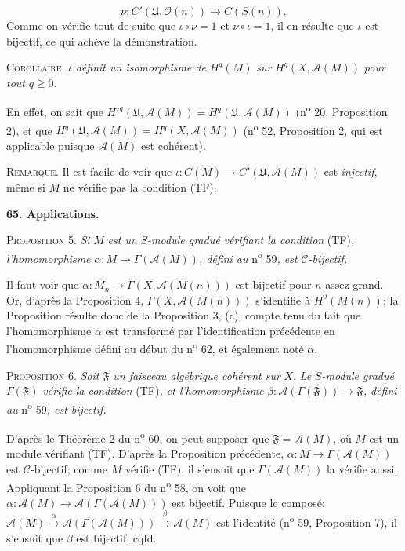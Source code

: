 \begin{equation*}
\nu : C'(\mathfrak{U}, \mathcal{O}(n)) \to C(S(n)).
\end{equation*}
Comme on vérifie tout de suite que $\iota \circ \nu = 1$ et $\nu \circ \iota = 1$, il en résulte que $\iota$ est bijectif, ce qui achève la démonstration.

\textsc{Corollaire}. $\iota$ \textit{définit un isomorphisme de} $H^q(M)$ \textit{sur} $H^q(X, \mathcal{A}(M))$ \textit{pour tout} $q \geqq 0$.

En effet, on sait que $H'^q(\mathfrak{U}, \mathcal{A}(M)) = H^q(\mathfrak{U}, \mathcal{A}(M))$ (n\textsuperscript{o} 20, Proposition 2), et que $H^q(\mathfrak{U}, \mathcal{A}(M)) = H^q(X, \mathcal{A}(M))$ (n\textsuperscript{o} 52, Proposition 2, qui est applicable puisque $\mathcal{A}(M)$ est cohérent).

\textsc{Remarque}. Il est facile de voir que $\iota : C(M) \to C'(\mathfrak{U}, \mathcal{A}(M))$ est \textit{injectif}, même si $M$ ne vérifie pas la condition (TF).


\textbf{65. Applications.}

\textsc{Proposition} 5. \textit{Si} $M$ \textit{est un} $S$\textit{-module gradué vérifiant la condition} (TF)\textit{, l'homomorphisme} $\alpha : M \to \Gamma(\mathcal{A}(M))$\textit{, défini au} n\textsuperscript{o} 59\textit{, est} $\mathcal{C}$\textit{-bijectif.}

Il faut voir que $\alpha : M_n \to \Gamma(X, \mathcal{A}(M(n)))$ est bijectif pour $n$ assez grand. Or, d'après la Proposition 4, $\Gamma(X, \mathcal{A}(M(n)))$ s'identifie à $H^0(M(n))$; la Proposition résulte donc de la Proposition 3, (c), compte tenu du fait que l'homomorphisme $\alpha$ est transformé par l'identification précédente en l'homomorphisme défini au début du n\textsuperscript{o} 62, et également noté $\alpha$.

\textsc{Proposition} 6. \textit{Soit} $\mathfrak{F}$ \textit{un faisceau algébrique cohérent sur} $X$. \textit{Le} $S$\textit{-module gradué} $\Gamma(\mathfrak{F})$ \textit{vérifie la condition} (TF)\textit{, et l'homomorphisme} $\beta : \mathcal{A}(\Gamma(\mathfrak{F})) \to \mathfrak{F}$\textit{, défini au} n\textsuperscript{o} 59\textit{, est bijectif.}

D'après le Théorème 2 du n\textsuperscript{o} 60, on peut supposer que $\mathfrak{F} = \mathcal{A}(M)$, où $M$ est un module vérifiant (TF). D'après la Proposition précédente, $\alpha : M \to \Gamma(\mathcal{A}(M))$ est $\mathcal{C}$-bijectif; comme $M$ vérifie (TF), il s'ensuit que $\Gamma(\mathcal{A}(M))$ la vérifie aussi. Appliquant la Proposition 6 du n\textsuperscript{o} 58, on voit que $\alpha : \mathcal{A}(M) \to \mathcal{A}(\Gamma(\mathcal{A}(M)))$ est bijectif. Puisque le composé: $\mathcal{A}(M) \xrightarrow{\ \alpha\ } \mathcal{A}(\Gamma(\mathcal{A}(M))) \xrightarrow{\ \beta\ } \mathcal{A}(M)$ est l'identité (n\textsuperscript{o} 59, Proposition 7), il s'ensuit que $\beta$ est bijectif, cqfd.


